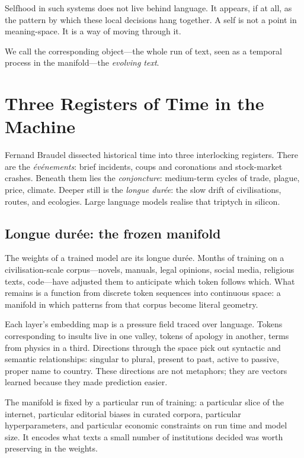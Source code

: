 \documentclass[12pt,a4paper]{article}
\begin{document}
Selfhood in such systems does not live behind language. It appears, if at all, as the pattern by which these local decisions hang together. A self is not a point in meaning-space. It is a way of moving through it.

We call the corresponding object---the whole run of text, seen as a temporal process in the manifold---the \emph{evolving text}.

\section{Three Registers of Time in the Machine}

Fernand Braudel dissected historical time into three interlocking registers.\cite{braudel1972} There are the \emph{événements}: brief incidents, coups and coronations and stock-market crashes. Beneath them lies the \emph{conjoncture}: medium-term cycles of trade, plague, price, climate. Deeper still is the \emph{longue durée}: the slow drift of civilisations, routes, and ecologies. Large language models realise that triptych in silicon.

\subsection{Longue durée: the frozen manifold}

The weights of a trained model are its longue durée. Months of training on a civilisation-scale corpus---novels, manuals, legal opinions, social media, religious texts, code---have adjusted them to anticipate which token follows which. What remains is a function from discrete token sequences into continuous space: a manifold in which patterns from that corpus become literal geometry.

Each layer's embedding map is a pressure field traced over language. Tokens corresponding to insults live in one valley, tokens of apology in another, terms from physics in a third. Directions through the space pick out syntactic and semantic relationships: singular to plural, present to past, active to passive, proper name to country. These directions are not metaphors; they are vectors learned because they made prediction easier.

The manifold is fixed by a particular run of training: a particular slice of the internet, particular editorial biases in curated corpora, particular hyperparameters, and particular economic constraints on run time and model size. It encodes what texts a small number of institutions decided was worth preserving in the weights.
\end{document}
